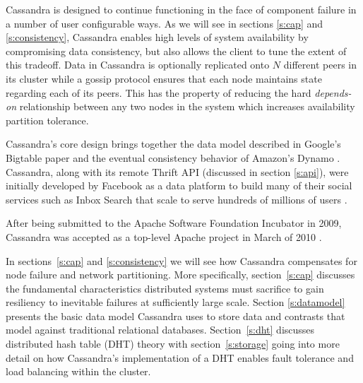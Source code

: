 \documentclass[twocolumn]{article}
\begin{document}
% 
% 

Cassandra is designed to continue functioning in the face of component failure in a number of user configurable ways.  As we will see in sections \ref{s:cap} and \ref{s:consistency}, Cassandra enables high levels of system availability by compromising data consistency, but also allows the client to tune the extent of this tradeoff.  Data in Cassandra is optionally replicated onto $N$ different peers in its cluster while a gossip protocol ensures that each node maintains state regarding each of its peers.  This has the property of reducing the hard \emph{depends-on} relationship between any two nodes in the system which increases availability partition tolerance.

Cassandra's core design brings together the data model described in Google's Bigtable paper \cite{ref:bigtable} and the eventual consistency behavior of Amazon's Dynamo \cite{ref:dynamo}.  Cassandra, along with its remote Thrift API \cite{ref:thrift} (discussed in section \ref{s:api}), were initially developed by Facebook as a data platform to build many of their social services such as Inbox Search that scale to serve hundreds of millions of users \cite{ref:facebook}.

After being submitted to the Apache Software Foundation Incubator in 2009, Cassandra was accepted as a top-level Apache project in March of 2010 \cite{ref:apacheblog}.

In sections~\ref{s:cap} and \ref{s:consistency} we will see how Cassandra compensates for node failure and network partitioning.  More specifically, section~\ref{s:cap} discusses the fundamental characteristics distributed systems must sacrifice to gain resiliency to inevitable failures at sufficiently large scale.  Section \ref{s:datamodel} presents the basic data model Cassandra uses to store data and contrasts that model against traditional relational databases.  Section~\ref{s:dht} discusses distributed hash table (DHT) theory with section~\ref{s:storage} going into more detail on how Cassandra's implementation of a DHT enables fault tolerance and load balancing within the cluster.
\end{document}
